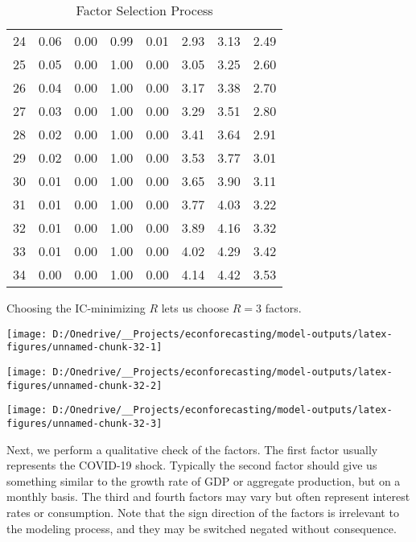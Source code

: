 \documentclass[11pt, letterpaper]{article}\usepackage[]{graphicx}\usepackage[]{color}
\begin{document}
\begin{table}[H]
\begin{tabular}{cccccccc}
   24 & 0.06 & 0.00 & 0.99 & 0.01 & 2.93 & 3.13 & 2.49 \\ 
   25 & 0.05 & 0.00 & 1.00 & 0.00 & 3.05 & 3.25 & 2.60 \\ 
   26 & 0.04 & 0.00 & 1.00 & 0.00 & 3.17 & 3.38 & 2.70 \\ 
   27 & 0.03 & 0.00 & 1.00 & 0.00 & 3.29 & 3.51 & 2.80 \\ 
   28 & 0.02 & 0.00 & 1.00 & 0.00 & 3.41 & 3.64 & 2.91 \\ 
   29 & 0.02 & 0.00 & 1.00 & 0.00 & 3.53 & 3.77 & 3.01 \\ 
   30 & 0.01 & 0.00 & 1.00 & 0.00 & 3.65 & 3.90 & 3.11 \\ 
   31 & 0.01 & 0.00 & 1.00 & 0.00 & 3.77 & 4.03 & 3.22 \\ 
   32 & 0.01 & 0.00 & 1.00 & 0.00 & 3.89 & 4.16 & 3.32 \\ 
   33 & 0.01 & 0.00 & 1.00 & 0.00 & 4.02 & 4.29 & 3.42 \\ 
   34 & 0.00 & 0.00 & 1.00 & 0.00 & 4.14 & 4.42 & 3.53 \\ 
   \hline
\end{tabular}
\endgroup
\caption{Factor Selection Process} 
\end{table}


Choosing the IC-minimizing $R$ lets us choose $R = 3$ factors.



{\centering \texttt{[image: D:/Onedrive/\_\_Projects/econforecasting/model-outputs/latex-figures/unnamed-chunk-32-1]} 

}




{\centering \texttt{[image: D:/Onedrive/\_\_Projects/econforecasting/model-outputs/latex-figures/unnamed-chunk-32-2]} 

}




{\centering \texttt{[image: D:/Onedrive/\_\_Projects/econforecasting/model-outputs/latex-figures/unnamed-chunk-32-3]} 

}




Next, we perform a qualitative check of the factors. The first factor usually represents the COVID-19 shock. Typically the second factor should give us something similar to the growth rate of GDP or aggregate production, but on a monthly basis. The third and fourth factors may vary but often represent interest rates or consumption. Note that the sign direction of the factors is irrelevant to the modeling process, and they may be switched negated without consequence. 
\end{document}
